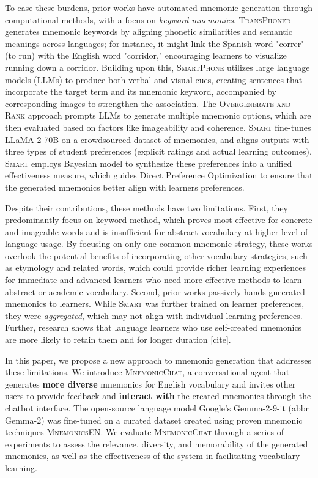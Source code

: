 \documentclass{article}
\begin{document}
To ease these burdens, prior works have automated mnemonic generation through computational methods, with a focus on \textit{keyword mnemonics}. \textsc{TransPhoner} generates mnemonic keywords by aligning phonetic similarities and semantic meanings across languages; for instance, it might link the Spanish word "correr" (to run) with the English word "corridor," encouraging learners to visualize running down a corridor. Building upon this, \textsc{SmartPhone} utilizes large language models (LLMs) to produce both verbal and visual cues, creating sentences that incorporate the target term and its mnemonic keyword, accompanied by corresponding images to strengthen the association. The \textsc{Overgenerate-and-Rank} approach prompts LLMs to generate multiple mnemonic options, which are then evaluated based on factors like imageability and coherence. \textsc{Smart} fine-tunes LLaMA-2 70B on a crowdsourced dataset of mnemonics, and aligns outputs with three types of student preferences (explicit ratings and actual learning outcomes). \textsc{Smart} employs Bayesian model to synthesize these preferences into a unified effectiveness measure, which guides Direct Preference Optimization to ensure that the generated mnemonics better align with learners preferences.

Despite their contributions, these methods have two limitations. First, they predominantly focus on keyword method, which proves most effective for concrete and imageable words and is insufficient for abstract vocabulary at higher level of language usage. By focusing on only one common mnemonic strategy, these works overlook the potential benefits of incorporating other vocabulary strategies, such as etymology and related words, which could provide richer learning experiences for immediate and
advanced learners who need more effective methods to learn abstract or academic vocabulary. Second, prior works passively hands gneerated mnemonics to learners. While \textsc{Smart} was further trained on learner preferences, they were \textit{aggregated}, which may not align with individual learning preferences. Further, research shows that language learners who use self-created mnemonics are more likely to retain them and for longer duration [cite].

In this paper, we propose a new approach to mnemonic generation that addresses these limitations. We introduce \textsc{MnemonicChat}, a conversational agent that generates \textbf{more diverse} mnemonics for English vocabulary and invites other users to provide feedback and \textbf{interact with} the created mnemonics through the chatbot interface. The open-source language model Google's Gemma-2-9-it (abbr Gemma-2) was fine-tuned on a curated dataset created using proven mnemonic techniques \textsc{MnemonicsEN}. We evaluate \textsc{MnemonicChat} through a series of experiments to assess the relevance, diversity, and memorability of the generated mnemonics, as well as the effectiveness of the system in facilitating vocabulary learning.
\end{document}
